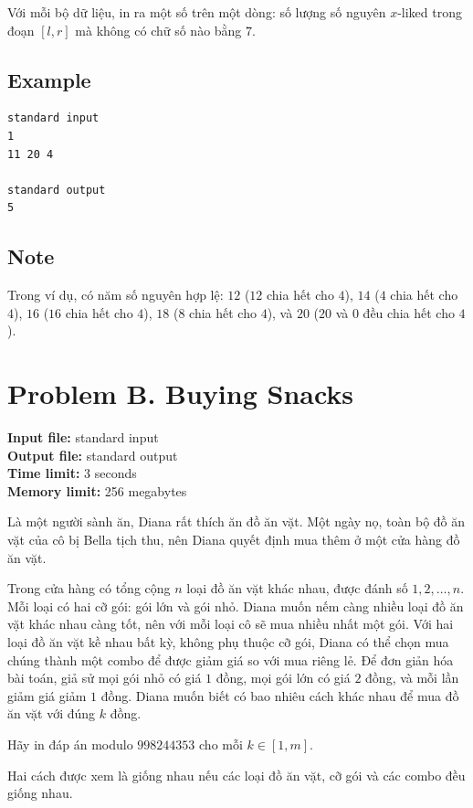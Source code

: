 \documentclass[11pt]{article}
\begin{document}
Với mỗi bộ dữ liệu, in ra một số trên một dòng: số lượng số nguyên $x$-liked
trong đoạn $[l,r]$ mà không có chữ số nào bằng $7$.

\subsection*{Example}

\begin{verbatim}
standard input
1
11 20 4

standard output
5
\end{verbatim}

\subsection*{Note}

Trong ví dụ, có năm số nguyên hợp lệ: $12$ ($12$ chia hết cho $4$), $14$
($4$ chia hết cho $4$), $16$ ($16$ chia hết cho $4$), $18$ ($8$ chia hết cho
$4$), và $20$ ($20$ và $0$ đều chia hết cho $4$).

\section{Problem B. Buying Snacks}

\noindent
\textbf{Input file:} standard input\\
\textbf{Output file:} standard output\\
\textbf{Time limit:} 3 seconds\\
\textbf{Memory limit:} 256 megabytes

Là một người sành ăn, Diana rất thích ăn đồ ăn vặt. Một ngày nọ, toàn bộ đồ
ăn vặt của cô bị Bella tịch thu, nên Diana quyết định mua thêm ở một cửa hàng
đồ ăn vặt.

Trong cửa hàng có tổng cộng $n$ loại đồ ăn vặt khác nhau, được đánh số
$1,2,\ldots,n$. Mỗi loại có hai cỡ gói: gói lớn và gói nhỏ. Diana muốn nếm
càng nhiều loại đồ ăn vặt khác nhau càng tốt, nên với mỗi loại cô sẽ mua
nhiều nhất một gói. Với hai loại đồ ăn vặt kề nhau bất kỳ, không phụ thuộc cỡ
gói, Diana có thể chọn mua chúng thành một combo để được giảm giá so với mua
riêng lẻ. Để đơn giản hóa bài toán, giả sử mọi gói nhỏ có giá $1$ đồng, mọi
gói lớn có giá $2$ đồng, và mỗi lần giảm giá giảm $1$ đồng. Diana muốn biết có
bao nhiêu cách khác nhau để mua đồ ăn vặt với đúng $k$ đồng.

Hãy in đáp án modulo $998244353$ cho mỗi $k\in [1,m]$.

Hai cách được xem là giống nhau nếu các loại đồ ăn vặt, cỡ gói và các combo
đều giống nhau.
\end{document}
